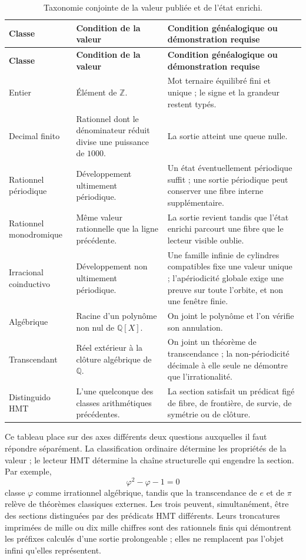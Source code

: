 \begin{longtable}{@{}>{\raggedright\arraybackslash}p{}
                    >{\raggedright\arraybackslash}p{}
                    >{\raggedright\arraybackslash}p{}@{}}
\caption{Taxonomie conjointe de la valeur publiée et de l'état enrichi.}
\label{p3-83-c44-s1:tab:taxonomia-conjunta-numeros-rev11}\\
\toprule
\textbf{Classe} & \textbf{Condition de la valeur} &
\textbf{Condition généalogique ou démonstration requise}\\
\midrule
\endfirsthead
\toprule
\textbf{Classe} & \textbf{Condition de la valeur} &
\textbf{Condition généalogique ou démonstration requise}\\
\midrule
\endhead
Entier & Élément de \(\mathbb Z\). & Mot ternaire équilibré fini et
unique ; le signe et la grandeur restent typés.\\
Decimal finito & Rationnel dont le dénominateur réduit divise une puissance
de \(1000\). & La sortie atteint une queue nulle.\\
Rationnel périodique & Développement ultimement périodique. & Un état
éventuellement périodique suffit ; une sortie périodique peut conserver une
fibre interne supplémentaire.\\
Rationnel monodromique & Même valeur rationnelle que la ligne précédente. & La
sortie revient tandis que l'état enrichi parcourt une fibre que le lecteur
visible oublie.\\
Irracional coinductivo & Développement non ultimement périodique. & Une famille
infinie de cylindres compatibles fixe une valeur unique ; l'apériodicité
globale exige une preuve sur toute l'orbite, et non une fenêtre finie.\\
Algébrique & Racine d'un polynôme non nul de \(\mathbb Q[X]\). & On joint
le polynôme et l'on vérifie son annulation.\\
Transcendant & Réel extérieur à la clôture algébrique de \(\mathbb Q\). & On
joint un théorème de transcendance ; la non-périodicité décimale à elle seule
ne démontre que l'irrationalité.\\
Distinguido HMT & L'une quelconque des classes arithmétiques précédentes. & La
section satisfait un prédicat figé de fibre, de frontière, de survie,
de symétrie ou de clôture.\\
\bottomrule
\end{longtable}

Ce tableau place sur des axes différents deux questions auxquelles il faut répondre
séparément. La classification ordinaire détermine les propriétés de la valeur ;
le lecteur HMT détermine la chaîne structurelle qui engendre la section. Par
exemple,
\[
 \varphi^2-\varphi-1=0
\]
classe \(\varphi\) comme irrationnel algébrique, tandis que la
transcendance de \(e\) et de \(\pi\) relève de théorèmes classiques externes.
Les trois peuvent, simultanément, être des sections distinguées par des prédicats
HMT différents. Leurs troncatures imprimées de mille ou dix mille chiffres sont
des rationnels finis qui démontrent les préfixes calculés d'une sortie prolongeable ; elles ne
remplacent pas l'objet infini qu'elles représentent.

